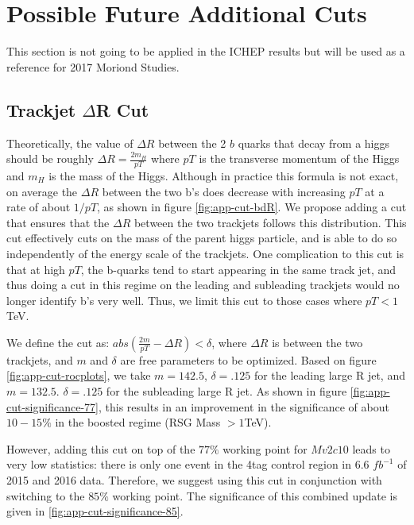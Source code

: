 \newcommand{\boostedcutsfigpath}{figures/boosted/Appendix-Cuts/}

\section{Possible Future Additional Cuts}

This section is not going to be applied in the ICHEP results but will be used as a reference for 2017 Moriond Studies.

\subsection{ Trackjet $\Delta$R Cut}

Theoretically, the value of $\Delta R$ between the 2 $b$ quarks that decay from a higgs should be roughly $\Delta R = \frac{2 m_H}{pT}$ where $pT$ is the transverse momentum of the Higgs and $m_H$ is the mass of the Higgs. Although in practice this formula is not exact, on average the $\Delta R$ between the two b's does decrease with increasing $pT$ at a rate of about $1/pT$, as shown in figure \ref{fig:app-cut-bdR}. We propose adding a cut that ensures that the $\Delta R$ between the two trackjets follows this distribution. This cut effectively cuts on the mass of the parent higgs particle, and is able to do so independently of the energy scale of the trackjets. One complication to this cut is that at high $pT$, the b-quarks tend to start appearing in the same track jet, and thus doing a cut in this regime on the leading and subleading trackjets would no longer identify b's very well. Thus, we limit this cut to those cases where $pT < 1$TeV. 

We define the cut as: $ abs( \frac{2 m }{pT} - \Delta R) < \delta$, where $\Delta R$ is between the two trackjets, and $m$ and $\delta$ are free parameters to be optimized. Based on figure \ref{fig:app-cut-rocplots}, we take $m = 142.5$, $\delta = .125$ for the leading large R jet, and $m = 132.5$. $\delta = .125$ for the subleading large R jet. As shown in figure \ref{fig:app-cut-significance-77}, this results in an improvement in the significance of about $10-15\%$ in the boosted regime (RSG Mass $> 1$TeV).

However, adding this cut on top of the $77 \%$ working point for $Mv2c10$ leads to very low statistics: there is only one event in the 4tag control region in 6.6 $fb^{-1}$ of 2015 and 2016 data. Therefore, we suggest using this cut in conjunction with switching to the $85  \%$ working point. The significance of this combined update is given in \ref{fig:app-cut-significance-85}. 

